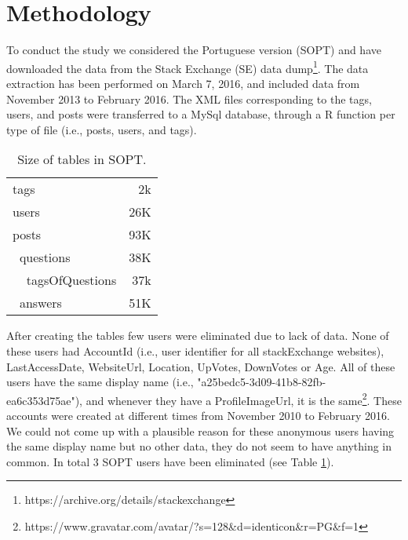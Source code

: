 \section{Methodology}
\noindent To conduct the study we considered the Portuguese version (SOPT) and have downloaded the data from the Stack Exchange (SE) data dump\footnote{https://archive.org/details/stackexchange}. The data extraction has been performed on March 7, 2016, and included data from November 2013 to February 2016. The XML files corresponding to the tags, users, and posts were transferred to a MySql database, through a R function per type of file (i.e., posts, users, and tags). 

\begin{table}[ht]
\begin{center}
\scriptsize{
\begin{tabular}{lr}
\hline
tags & 2k \\
users & 26K \\
posts & 93K \\
$\;\;$questions & 38K \\
$\;\;\;\;$tagsOfQuestions & 37k \\ 
$\;\;$answers & 51K \\
\end{tabular}
\caption{Size of tables in SOPT.}
\label{tbl:dbSize}
}
\end{center}
\end{table}

After creating the tables few users were eliminated due to lack of data. None of these users had AccountId (i.e., user identifier for all stackExchange websites), LastAccessDate, WebsiteUrl, Location, UpVotes, DownVotes or Age. All of these users have the same display name (i.e., "a25bedc5-3d09-41b8-82fb-ea6c353d75ae"), and whenever they have a ProfileImageUrl, it is the same\footnote{https://www.gravatar.com/avatar/?s=128\&d=identicon\&r=PG\&f=1}.
These accounts were created at different times from November 2010 to February 2016. We could not come up with a plausible reason for these anonymous users having the same display name but no other data, they do not seem to have anything in common. In total 3 SOPT users have been eliminated (see Table \ref{tbl:dbSize}).